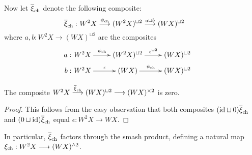 \documentclass[10pt]{article}
\begin{document}
\begin{Grothendieck Multiplicativity}
Now let $\overline{\xi}_{\textup{ch}}$ denote the following composite:
\[\makebox[0mm][r]{$\overline{\xi}_{\textup{ch}}:\ $}W^2X\overset{\psi_{\textup{ch}}}{\to}(W^2X)^{\sqcup2}\overset{a\sqcup b}{\to}(WX)^{\sqcup2}\]
where $a,b:W^2X\to(WX)^{\sqcup2}$ are the composites
\[\xymatrix@R=2mm{
\makebox[0mm][r]{$a:\ $}W^2X\ar[r]^-{\psi_{\textup{ch}}}
&%
(W^2X)^{\sqcup2}\ar[r]^-{\epsilon^{\sqcup2}}
&%
(WX)^{\sqcup2}\\
\makebox[0mm][r]{$b:\ $}W^2X\ar[r]^-{\epsilon}
&%
(WX)\ar[r]^-{\psi_{\textup{ch}}}
&%
(WX)^{\sqcup2}
}\]
\begin{lem}
The composite 
$W^2X\overset{\overline{\xi}_{\textup{ch}}}{\to}(WX)^{\sqcup2}\to(WX)^{\times2}$ is zero.
\end{lem}
\begin{proof}
This follows from the easy observation that both composites $(\textup{id}\sqcup0)\overline{\xi}_{\textup{ch}}$ and $(0\sqcup\textup{id})\overline{\xi}_{\textup{ch}}$ equal $\epsilon:W^2X\to WX$.
\end{proof}
In particular, $\overline{\xi}_{\textup{ch}}$ factors through the smash product, defining a natural map $\xi_{\textup{ch}}:W^2X\to (WX)^{\wedge 2}$.

\end{Grothendieck Multiplicativity}
\end{document}
